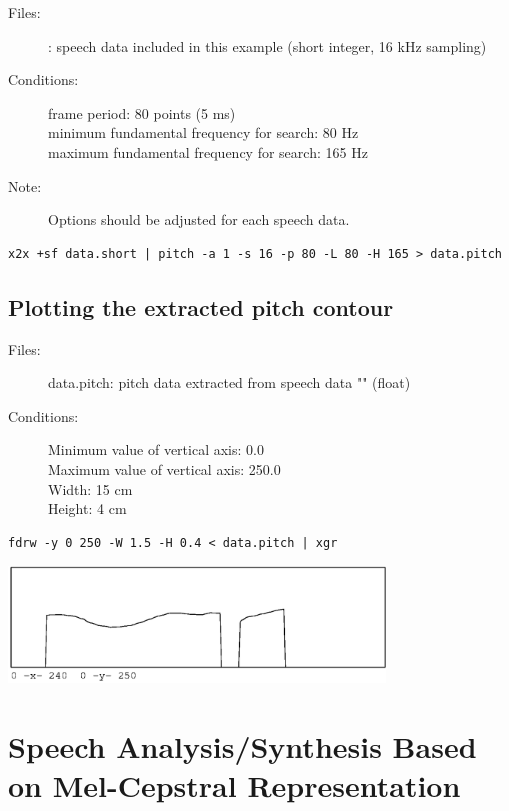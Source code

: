\documentclass[a4paper,10pt]{article}
\begin{document}
\begin{description}
\item[Files:]
  : speech data included in this example (short integer, 16 kHz sampling)
\item[Conditions:]
  frame period: 80 points (5 ms)\\
  minimum fundamental frequency for search: 80 Hz\\
  maximum fundamental frequency for search: 165 Hz
\item[Note:]
  Options should be adjusted for each speech data.
\end{description}

\begin{verbatim}
x2x +sf data.short | pitch -a 1 -s 16 -p 80 -L 80 -H 165 > data.pitch
\end{verbatim}

\subsection{Plotting the extracted pitch contour}

\begin{description}
\item[Files:]
  data.pitch: pitch data extracted from speech data
           "" (float)
\item[Conditions:]
  Minimum value of vertical axis: 0.0\\
  Maximum value of vertical axis: 250.0\\
  Width: 15 cm\\
  Height: 4 cm
\end{description}

\begin{verbatim}
fdrw -y 0 250 -W 1.5 -H 0.4 < data.pitch | xgr
\end{verbatim}

\includegraphics[width=10cm]{eps/data.pitch.fdrw.eps}

\section{Speech Analysis/Synthesis Based on Mel-Cepstral Representation}
\end{document}
